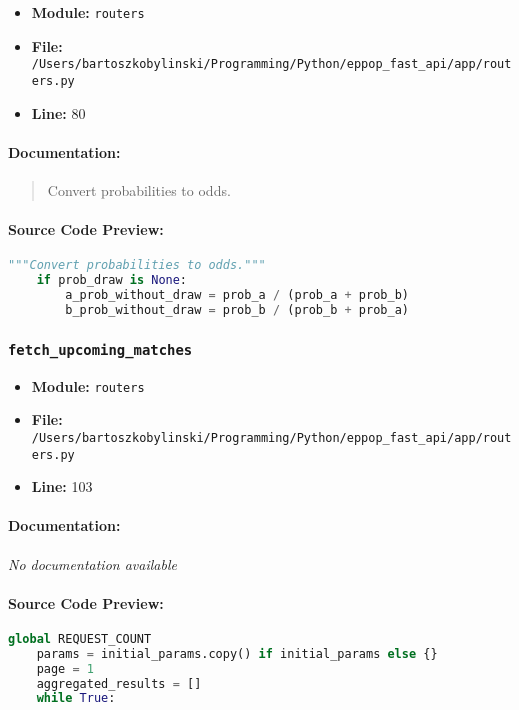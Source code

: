 \documentclass[11pt,a4paper]{article}
\begin{document}
\begin{itemize}
    \item \textbf{Module:} \texttt{routers}
    \item \textbf{File:} \texttt{/Users/bartoszkobylinski/Programming/Python/eppop\_fast\_api/app/routers.py}
    \item \textbf{Line:} 80
\end{itemize}

\paragraph{Documentation:}
\begin{quote}
Convert probabilities to odds.
\end{quote}

\paragraph{Source Code Preview:}
\begin{lstlisting}[language=Python]
    """Convert probabilities to odds."""
    if prob_draw is None:
        a_prob_without_draw = prob_a / (prob_a + prob_b)
        b_prob_without_draw = prob_b / (prob_b + prob_a)

\end{lstlisting}

\vspace{1em}
\subsubsection{\texttt{fetch\_upcoming\_matches}}

\begin{itemize}
    \item \textbf{Module:} \texttt{routers}
    \item \textbf{File:} \texttt{/Users/bartoszkobylinski/Programming/Python/eppop\_fast\_api/app/routers.py}
    \item \textbf{Line:} 103
\end{itemize}

\paragraph{Documentation:} \textit{No documentation available}

\paragraph{Source Code Preview:}
\begin{lstlisting}[language=Python]
    global REQUEST_COUNT
    params = initial_params.copy() if initial_params else {}
    page = 1
    aggregated_results = []
    while True:
\end{lstlisting}
\end{document}
